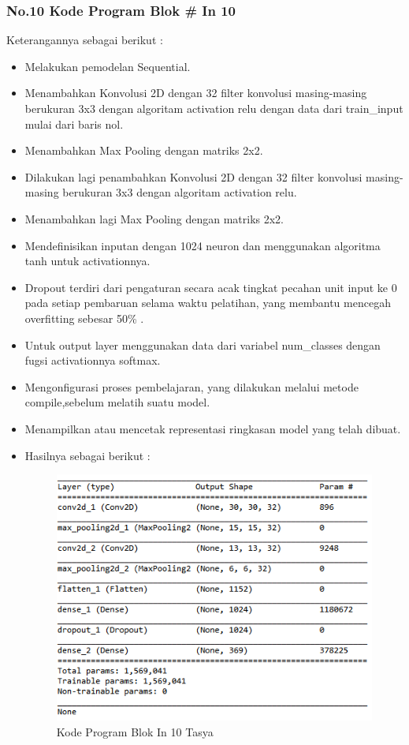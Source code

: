 \subsubsection{No.10 Kode Program Blok \# In 10}

Keterangannya sebagai berikut :\\
\begin{itemize}
\item Melakukan pemodelan Sequential.
\item Menambahkan Konvolusi 2D dengan 32 filter konvolusi masing-masing berukuran 3x3 dengan algoritam activation relu dengan data dari train\_input mulai dari baris nol.
\item Menambahkan Max Pooling dengan matriks 2x2.
\item Dilakukan lagi penambahkan Konvolusi 2D dengan 32 filter konvolusi masing-masing berukuran 3x3 dengan algoritam activation relu.
\item Menambahkan lagi Max Pooling dengan matriks 2x2.
\item Mendefinisikan inputan dengan 1024 neuron dan menggunakan algoritma tanh untuk activationnya.
\item Dropout terdiri dari pengaturan secara acak tingkat pecahan unit input ke 0 pada setiap pembaruan selama waktu pelatihan, yang membantu mencegah overfitting sebesar 50\% .
\item Untuk output layer menggunakan data dari variabel num\_classes dengan fugsi activationnya softmax.
\item Mengonfigurasi proses pembelajaran, yang dilakukan melalui metode compile,sebelum melatih suatu model.
\item Menampilkan atau mencetak representasi ringkasan model yang telah dibuat.
\item Hasilnya sebagai berikut :\\
\begin{figure}[ht]
\centering
\includegraphics[scale=0.5]{figures/Chapter 7/1164086/Praktek/chapter7tasya23.png}
\caption{Kode Program Blok In 10 Tasya}
\label{Praktek}
\end{figure}
\end{itemize}

